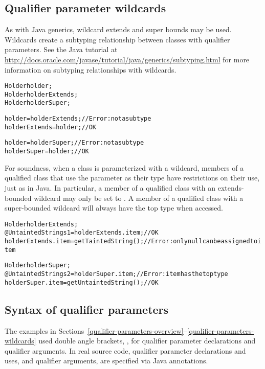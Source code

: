 \subsection{Qualifier parameter wildcards\label{qualifier-parameters-wildcards}}

As with Java generics, wildcard extends and super bounds may
be used. Wildcards create a subtyping relationship between classes with
qualifier parameters. See the Java tutorial at
\url{http://docs.oracle.com/javase/tutorial/java/generics/subtyping.html}
for more information on subtyping relationships with wildcards.

\begin{alltt}
    Holder holder;
    Holder holderExtends;
    Holder holderSuper;

    holder = holderExtends;    // Error: not a subtype
    holderExtends = holder;    // OK

    holder = holderSuper;    // Error: not a subtype
    holderSuper = holder;    // OK
\end{alltt}

For soundness, when a class is parameterized with a
wildcard, members of a qualified class that use the parameter as their type
have restrictions on their use, just as in Java.
In particular, a member of a qualified class with an extends-bounded wildcard
may only be set to . A member of a qualified class with a
super-bounded wildcard will always have the top type when accessed.

\begin{alltt}
    Holder holderExtends;
    @Untainted String s1 = holderExtends.item;  // OK
    holderExtends.item = getTaintedString();    // Error: only null can be assigned to item

    Holder holderSuper;
    @Untainted String s2 = holderSuper.item;    // Error: item has the top type
    holderSuper.item = getUntaintedString();    // OK
\end{alltt}

\subsection{Syntax of qualifier parameters\label{qualifier-parameters-syntax}}

The examples in
Sections~\ref{qualifier-parameters-overview}--\ref{qualifier-parameters-wildcards}
used double angle brackets, , for qualifier
parameter declarations and qualifier arguments.
In real source code, qualifier parameter declarations and uses, and qualifier
arguments, are specified via Java annotations.

